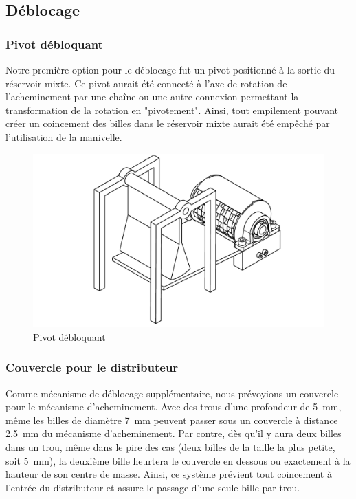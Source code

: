 \subsection{Déblocage}
\subsubsection{Pivot débloquant} 
Notre première option pour le déblocage fut un pivot positionné à la sortie du réservoir mixte. Ce pivot aurait été connecté à l'axe de rotation de l'acheminement par une chaîne ou une autre connexion permettant la transformation de la rotation en "pivotement". Ainsi, tout empilement pouvant créer un coincement des billes dans le réservoir mixte aurait été empêché par l'utilisation de la manivelle.

\begin{figure}
    \centering
    \includegraphics[width=\textwidth]{Graphics/Images_concepts_Leon/ASSEMBLAGE_LOURD_AVEC_PIVOT.pdf}
    \caption{Pivot débloquant}
\end{figure}

\subsubsection{Couvercle pour le distributeur}
Comme mécanisme de déblocage supplémentaire, nous prévoyions un couvercle pour le mécanisme d'acheminement. Avec des trous d'une profondeur de \SI{5}{\milli\metre}, même les billes de diamètre \SI{7}{\milli\metre} peuvent passer sous un couvercle à distance \SI{2.5}{\milli\metre} du mécanisme d'acheminement. Par contre, dès qu'il y aura deux billes dans un trou, même dans le pire des cas (deux billes de la taille la plus petite, soit \SI{5}{\milli\metre}), la deuxième bille heurtera le couvercle en dessous ou exactement à la hauteur de son centre de masse. Ainsi, ce système prévient tout coincement à l'entrée du distributeur et assure le passage d'une seule bille par trou.

